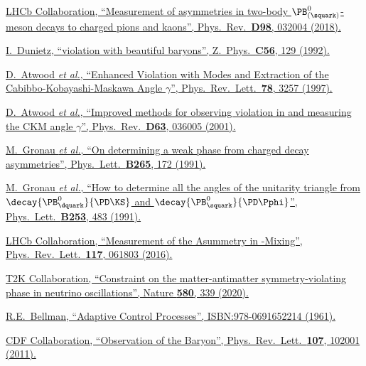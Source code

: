 \href{https://doi.org/10.1103/PhysRevD.98.032004}{LHCb Collaboration, \enquote{Measurement of \CP asymmetries in two-body $\PB^0_{(\squark)}$-meson decays to charged pions and kaons}, Phys.\ Rev.\ \textbf{D98}, 032004 (2018).}

\href{https://doi.org/10.1007/BF01589716}{I.~Dunietz, \enquote{\CP violation with beautiful baryons}, Z.\ Phys.\ \textbf{C56}, 129 (1992).}

\href{https://doi.org/10.1103/PhysRevLett.78.3257}{D.~Atwood \textit{et al.}, \enquote{Enhanced \CP Violation with \decay{\PB}{\PK\Dz(\Dzb)} Modes and Extraction of the Cabibbo-Kobayashi-Maskawa Angle $\gamma$}, Phys.\ Rev.\ Lett.\ \textbf{78}, 3257 (1997).}

\href{https://doi.org/10.1103/PhysRevD.63.036005}{D.~Atwood \textit{et al.}, \enquote{Improved methods for observing \CP violation in \decay{\Bpm}{\PK\PD} and measuring the CKM angle $\gamma$}, Phys.\ Rev.\ \textbf{D63}, 036005 (2001).}

\href{https://doi.org/10.1016/0370-2693(91)90034-N}{M.~Gronau \textit{et al.}, \enquote{On determining a weak phase from charged \PB decay asymmetries}, Phys.\ Lett.\ \textbf{B265}, 172 (1991).}

\href{https://doi.org/10.1016/0370-2693(91)91756-L}{M.~Gronau \textit{et al.}, \enquote{How to determine all the angles of the unitarity triangle from $\decay{\PB_\dquark^0}{\PD\KS}$ and $\decay{\PB_\squark^0}{\PD\Pphi}$}, Phys.\ Lett.\ \textbf{B253}, 483 (1991).}

\href{https://doi.org/10.1103/PhysRevLett.117.061803}{LHCb Collaboration, \enquote{Measurement of the \CP Asummetry in \Bs-\Bsb Mixing}, Phys.\ Rev.\ Lett.\ \textbf{117}, 061803 (2016).}

\href{https://doi.org/10.1038/s41586-020-2177-0}{T2K Collaboration, \enquote{Constraint on the matter-antimatter symmetry-violating phase in neutrino oscillations}, Nature \textbf{580}, 339 (2020).}

\href{https://press.princeton.edu/books/hardcover/9780691652214/adaptive-control-processes}{R.E.~Bellman, \enquote{Adaptive Control Processes}, ISBN:978-0691652214 (1961).}

\href{https://doi.org/10.1103/PhysRevLett.107.102001}{CDF Collaboration, \enquote{Observation of the \Xibz Baryon}, Phys.\ Rev.\ Lett.\ \textbf{107}, 102001 (2011).}

